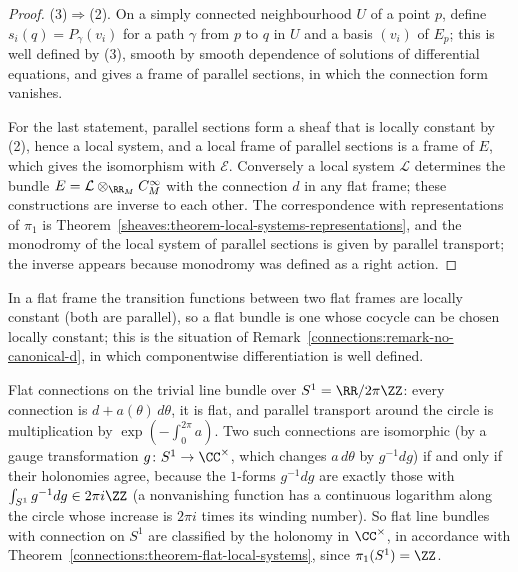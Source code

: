 \begin{proof}
(3)$\Rightarrow$(2). On a simply connected neighbourhood $U$ of a point $p$, define $s_i(q) = P_\gamma(v_i)$ for a path $\gamma$ from $p$ to $q$ in $U$ and a basis $(v_i)$ of $E_p$; this is well defined by (3),
smooth by smooth dependence of solutions of differential equations, and gives a frame of parallel sections, in which the connection form vanishes.

For the last statement, parallel sections form a sheaf that is locally constant by (2), hence a local system, and a local frame of parallel sections is a frame of $E$, which gives the isomorphism with
$\mathcal{E}$. Conversely a local system $\mathcal{L}$ determines the bundle $E = \mathcal{L} \otimes_{\RR_M} C^\infty_M$ with the connection $d$ in any flat frame; these constructions are inverse to each
other. The correspondence with representations of $\pi_1$ is Theorem~\ref{sheaves:theorem-local-systems-representations}, and the monodromy of the local system of parallel sections is given by parallel
transport; the inverse appears because monodromy was defined as a right action.
\end{proof}

In a flat frame the transition functions between two flat frames are locally constant (both are parallel), so a flat bundle is one whose cocycle can be chosen locally
constant; this is the situation of Remark~\ref{connections:remark-no-canonical-d}, in which componentwise differentiation is well defined.

\begin{example}\label{connections:example-flat-circle}
Flat connections on the trivial line bundle over $S^1 = \RR/2\pi\ZZ$: every connection is $d + a(\theta)\,d\theta$, it is flat, and parallel transport around the circle is multiplication by $\exp(-\int_0^{2\pi}a)$. Two such connections are
isomorphic (by a gauge transformation $g \colon S^1 \to \CC^\times$, which changes $a\,d\theta$ by $g^{-1}dg$) if and only if their holonomies agree, because the $1$-forms $g^{-1}dg$ are exactly those with $\int_{S^1}g^{-1}dg \in 2\pi i\ZZ$
(a nonvanishing function has a continuous logarithm along the circle whose increase is $2\pi i$ times its winding number). So flat line bundles with connection on $S^1$ are classified by the holonomy in $\CC^\times$, in accordance with
Theorem~\ref{connections:theorem-flat-local-systems}, since $\pi_1(S^1) = \ZZ$.
\end{example}

